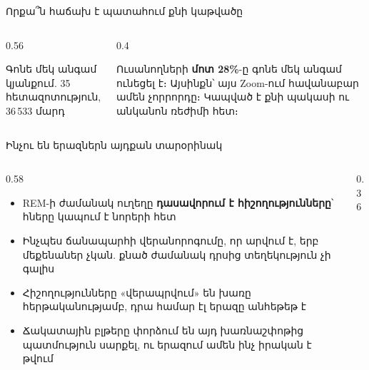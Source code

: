 \begin{frame}{Որքա՞ն հաճախ է պատահում քնի կաթվածը}
  \begin{columns}[c]
    \begin{column}{0.56\textwidth}
      \centering
      \par
      {\scriptsize Գոնե մեկ անգամ կյանքում. 35 հետազոտություն, 36\,533 մարդ}
    \end{column}
    \begin{column}{0.4\textwidth}
      \begin{card}[colback=butter!45!cream]
        Ուսանողների \textbf{մոտ 28\%}-ը գոնե մեկ անգամ ունեցել է։ Այսինքն՝ այս Zoom-ում հավանաբար ամեն չորրորդը։ Կապված է քնի պակասի ու անկանոն ռեժիմի հետ։
      \end{card}
      \vspace{2mm}
    \end{column}
  \end{columns}
\end{frame}

\begin{frame}{Ինչու են երազներն այդքան տարօրինակ}
  \begin{columns}[c]
    \begin{column}{0.58\textwidth}
      \begin{itemize}
        \item REM-ի ժամանակ ուղեղը \textbf{դասավորում է հիշողությունները}՝ հները կապում է նորերի հետ
        \item Ինչպես ճանապարհի վերանորոգումը, որ արվում է, երբ մեքենաներ չկան. քնած ժամանակ դրսից տեղեկություն չի գալիս
        \item<2-> Հիշողությունները «վերապրվում» են խառը հերթականությամբ, դրա համար էլ երազը անհեթեթ է
        \item<3-> Ճակատային բլթերը փորձում են այդ խառնաշփոթից պատմություն սարքել, ու երազում ամեն ինչ իրական է թվում
      \end{itemize}
    \end{column}
    \begin{column}{0.36\textwidth}
      \centering
    \end{column}
  \end{columns}
\end{frame}

